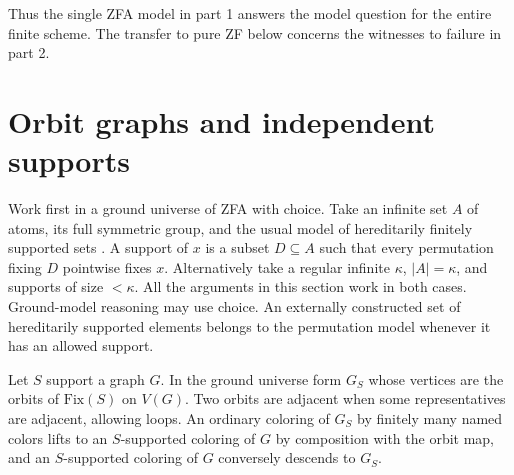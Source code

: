 \documentclass[11pt]{article}
\newcommand{\Fix}{\mathrm{Fix}}
\begin{document}
Thus the single ZFA model in part 1 answers the model question for the entire finite scheme. The transfer to pure ZF below concerns the witnesses to failure in part 2.

\section{Orbit graphs and independent supports}
Work first in a ground universe of ZFA with choice. Take an infinite set $A$ of atoms, its full symmetric group, and the usual model of hereditarily finitely supported sets \cite{jech}. A support of $x$ is a subset $D\subseteq A$ such that every permutation fixing $D$ pointwise fixes $x$. Alternatively take a regular infinite $\kappa$, $|A|=\kappa$, and supports of size $<\kappa$. All the arguments in this section work in both cases. Ground-model reasoning may use choice. An externally constructed set of hereditarily supported elements belongs to the permutation model whenever it has an allowed support.

Let $S$ support a graph $G$. In the ground universe form $G_S$ whose vertices are the orbits of $\Fix(S)$ on $V(G)$. Two orbits are adjacent when some representatives are adjacent, allowing loops. An ordinary coloring of $G_S$ by finitely many named colors lifts to an $S$-supported coloring of $G$ by composition with the orbit map, and an $S$-supported coloring of $G$ conversely descends to $G_S$.
\end{document}

